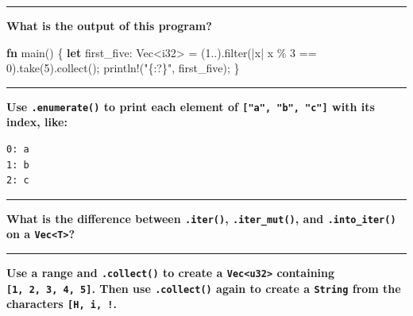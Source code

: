 \documentclass[
  11pt,
]{article}
\newenvironment{Shaded}{}{}
\newcommand{\DataTypeTok}[1]{\textcolor[rgb]{0.56,0.13,0.00}{#1}}
\newcommand{\DecValTok}[1]{\textcolor[rgb]{0.25,0.63,0.44}{#1}}
\newcommand{\KeywordTok}[1]{\textcolor[rgb]{0.00,0.44,0.13}{\textbf{#1}}}
\newcommand{\NormalTok}[1]{#1}
\newcommand{\OperatorTok}[1]{\textcolor[rgb]{0.40,0.40,0.40}{#1}}
\newcommand{\PreprocessorTok}[1]{\textcolor[rgb]{0.74,0.48,0.00}{#1}}
\newcommand{\StringTok}[1]{\textcolor[rgb]{0.25,0.44,0.63}{#1}}
\begin{document}
\begin{center}\rule{0.5\linewidth}{0.5pt}\end{center}

\textbf{What is the output of this program?}

\begin{Shaded}
\begin{Highlighting}[]
\KeywordTok{fn}\NormalTok{ main() }\OperatorTok{\{}
    \KeywordTok{let}\NormalTok{ first\_five}\OperatorTok{:} \DataTypeTok{Vec}\OperatorTok{\textless{}}\DataTypeTok{i32}\OperatorTok{\textgreater{}} \OperatorTok{=}\NormalTok{ (}\DecValTok{1}\OperatorTok{..}\NormalTok{)}\OperatorTok{.}\NormalTok{filter(}\OperatorTok{|}\NormalTok{x}\OperatorTok{|}\NormalTok{ x }\OperatorTok{\%} \DecValTok{3} \OperatorTok{==} \DecValTok{0}\NormalTok{)}\OperatorTok{.}\NormalTok{take(}\DecValTok{5}\NormalTok{)}\OperatorTok{.}\NormalTok{collect()}\OperatorTok{;}
    \PreprocessorTok{println!}\NormalTok{(}\StringTok{"\{:?\}"}\OperatorTok{,}\NormalTok{ first\_five)}\OperatorTok{;}
\OperatorTok{\}}
\end{Highlighting}
\end{Shaded}

\begin{center}\rule{0.5\linewidth}{0.5pt}\end{center}

\textbf{Use \texttt{.enumerate()} to print each element of
\texttt{{[}"a",\ "b",\ "c"{]}} with its index, like:}

\begin{verbatim}
0: a
1: b
2: c
\end{verbatim}

\begin{Shaded}
\begin{Highlighting}[]

\end{Highlighting}
\end{Shaded}

\begin{center}\rule{0.5\linewidth}{0.5pt}\end{center}

\textbf{What is the difference between \texttt{.iter()},
\texttt{.iter\_mut()}, and \texttt{.into\_iter()} on a
\texttt{Vec\textless{}T\textgreater{}}?}

\begin{center}\rule{0.5\linewidth}{0.5pt}\end{center}

\textbf{Use a range and \texttt{.collect()} to create a
\texttt{Vec\textless{}u32\textgreater{}} containing
\texttt{{[}1,\ 2,\ 3,\ 4,\ 5{]}}. Then use \texttt{.collect()} again to
create a \texttt{String} from the characters
\texttt{{[}\textquotesingle{}H\textquotesingle{},\ \textquotesingle{}i\textquotesingle{},\ \textquotesingle{}!\textquotesingle{}{]}}.}
\end{document}
